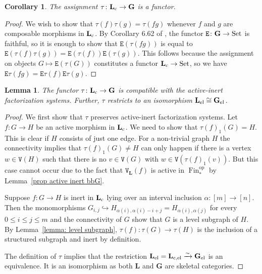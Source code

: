\documentclass{amsart}
\numberwithin{theorem}{subsection}
\newtheorem{corollary}[theorem]{Corollary}
\newtheorem{lemma}[theorem]{Lemma}
\theoremstyle{definition}
\providecommand{\op}{\mathrm{op}}
\providecommand{\xel}{\mathrm{el}}
\newcommand{\finset}{\operatorname{Fin}}
\newcommand{\pfinset}{\finset_*}
\newcommand{\isoto}{\xrightarrow{\sim}}
\newcommand{\name}[1]{\ensuremath{\text{\textup{#1}}}}
\newcommand{\levelg}{\mathbf{L}}
\newcommand{\levelgconn}{\levelg_{\name{c}}}
\newcommand{\levelel}{\levelg_{\name{el}}}
\newcommand{\bbY}{\mathbf{G}}
\newcommand{\Set}{\name{Set}}
\newcommand{\edge}{\mathtt{E}}
\newcommand{\vertex}{\mathtt{V}}
\begin{document}
\begin{corollary}
\label{corollary functor l to y}
The assignment $\tau \colon \levelgconn \to \bbY$ is a functor.
\end{corollary}
\begin{proof}
We wish to show that $\tau(f)\tau(g) = \tau(fg)$ whenever $f$ and $g$ are composable morphisms in $\levelgconn$.
By Corollary 6.62 of \cite{hrybook}, the functor $\edge \colon \bbY \to \Set$ is faithful, so it is enough to show that $\edge(\tau(fg))$ is equal to $\edge(\tau(f)\tau(g)) = \edge(\tau(f)) \edge(\tau(g))$.
This follows because the assignment on objects $G \mapsto \edge(\tau(G))$ constitutes a functor $\levelgconn \to \Set$, so we have $\edge\tau(fg) = \edge\tau(f) \edge\tau(g)$.
\end{proof}

\begin{lemma}\label{lem factorization int el}
The functor $\tau\colon \levelgconn \to \bbY$ is compatible with the active-inert factorization systems.
Further, $\tau$ restricts to an isomorphism $\levelel \cong \bbY_\xel$.
\end{lemma}
\begin{proof}
	We first show that $\tau$ preserves active-inert factorization systems.
	Let $f\colon G\to H$ be an active morphism in $\levelgconn$. We need to show that $\tau(f)_1(G)=H$. This is clear if $H$ consists of just one edge. For a non-trivial graph $H$ the connectivity implies that $\tau(f)_1(G)\neq H$ can only happen if there is a vertex $w\in \vertex(H)$ such that there is no $v\in \vertex(G)$ with $w\in \vertex(\tau(f)_1(v))$. But this case cannot occur due to the fact that $\vertex_{\levelg}(f)$ is active in $\pfinset^\op$ by Lemma~\ref{prop active inert bbG}.
	
	Suppose $f\colon G\to H$ is inert in $\levelgconn$ lying over an interval inclusion $\alpha\colon [m]\to [n]$.
	Then the monomorphisms $G_{i,j}\hookrightarrow H_{\alpha(i), \alpha(i)-i+j}= H_{\alpha(i), \alpha(j)}$ for every $0\leq i\leq j\leq m$ and the connectivity of $G$ show that $G$ is a level subgraph of $H$. By Lemma~\ref{lemma: level subgraph}, $\tau(f)\colon \tau(G)\to \tau(H)$ is the inclusion of a structured subgraph and inert by definition.
	
	The definition of $\tau$ implies that the restriction $\levelel = \levelg_{\name{c,el}} \isoto \bbY_\xel$ is an equivalence.
It is an isomorphism as both $\levelg$ and $\bbY$ are skeletal categories.
\end{proof}
\end{document}
